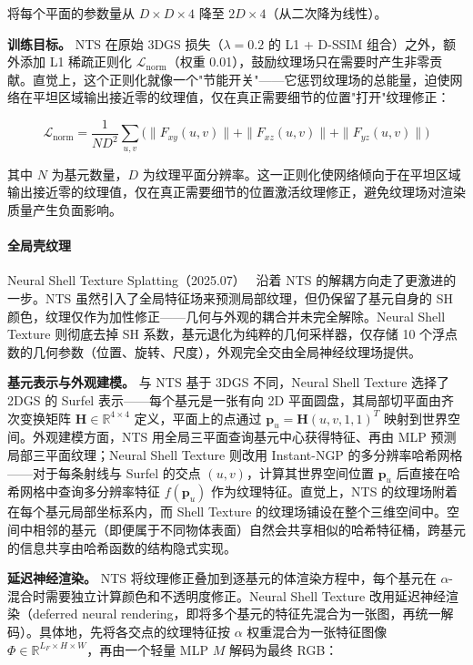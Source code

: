 将每个平面的参数量从 $D \times D \times 4$ 降至 $2D \times 4$（从二次降为线性）。

\smallskip
\noindent\textbf{训练目标。}
NTS 在原始 3DGS 损失（$\lambda=0.2$ 的 L1 + D-SSIM 组合）之外，额外添加 L1 稀疏正则化 $\mathcal{L}_{\text{norm}}$（权重 0.01），鼓励纹理场只在需要时产生非零贡献。直觉上，这个正则化就像一个"节能开关"——它惩罚纹理场的总能量，迫使网络在平坦区域输出接近零的纹理值，仅在真正需要细节的位置"打开"纹理修正：

\begin{equation}
\mathcal{L}_{\text{norm}} = \frac{1}{N D^2} \sum_{u,v} \big(\|F_{xy}(u,v)\| + \|F_{xz}(u,v)\| + \|F_{yz}(u,v)\|\big)
\end{equation}

其中 $N$ 为基元数量，$D$ 为纹理平面分辨率。这一正则化使网络倾向于在平坦区域输出接近零的纹理值，仅在真正需要细节的位置激活纹理修正，避免纹理场对渲染质量产生负面影响。

\paragraph{全局壳纹理}

Neural Shell Texture Splatting（2025.07）~\cite{2507_20200} 沿着 NTS 的解耦方向走了更激进的一步。NTS 虽然引入了全局特征场来预测局部纹理，但仍保留了基元自身的 SH 颜色，纹理仅作为加性修正——几何与外观的耦合并未完全解除。Neural Shell Texture 则彻底去掉 SH 系数，基元退化为纯粹的几何采样器，仅存储 10 个浮点数的几何参数（位置、旋转、尺度），外观完全交由全局神经纹理场提供。

\smallskip
\noindent\textbf{基元表示与外观建模。}
与 NTS 基于 3DGS 不同，Neural Shell Texture 选择了 2DGS 的 Surfel 表示——每个基元是一张有向 2D 平面圆盘，其局部切平面由齐次变换矩阵 $\mathbf{H} \in \mathbb{R}^{4 \times 4}$ 定义，平面上的点通过 $\mathbf{p}_u = \mathbf{H}(u,v,1,1)^T$ 映射到世界空间。外观建模方面，NTS 用全局三平面查询基元中心获得特征、再由 MLP 预测局部三平面纹理；Neural Shell Texture 则改用 Instant-NGP 的多分辨率哈希网格——对于每条射线与 Surfel 的交点 $(u,v)$，计算其世界空间位置 $\mathbf{p}_u$ 后直接在哈希网格中查询多分辨率特征 $f(\mathbf{p}_u)$ 作为纹理特征。直觉上，NTS 的纹理场附着在每个基元局部坐标系内，而 Shell Texture 的纹理场铺设在整个三维空间中。空间中相邻的基元（即便属于不同物体表面）自然会共享相似的哈希特征桶，跨基元的信息共享由哈希函数的结构隐式实现。

\smallskip
\noindent\textbf{延迟神经渲染。}
NTS 将纹理修正叠加到逐基元的体渲染方程中，每个基元在 $\alpha$-混合时需要独立计算颜色和不透明度修正。Neural Shell Texture 改用延迟神经渲染（deferred neural rendering，即将多个基元的特征先混合为一张图，再统一解码）。具体地，先将各交点的纹理特征按 $\alpha$ 权重混合为一张特征图像 $\Phi \in \mathbb{R}^{L_F \times H \times W}$，再由一个轻量 MLP $M$ 解码为最终 RGB：

